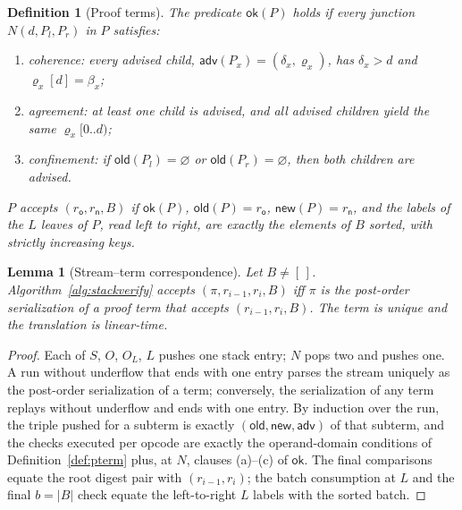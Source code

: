 \documentclass[twocolumn]{article}
\newtheorem{definition}{Definition}
\newtheorem{lemma}{Lemma}
\begin{document}
\begin{definition}[Proof terms]
The predicate $\mathsf{ok}(P)$ holds if every junction $N(d, P_l, P_r)$ in $P$ satisfies:
\begin{enumerate}[nosep,label=(\alph*)]
  \item \emph{coherence}: every advised child, $\mathsf{adv}(P_x) = (\delta_x, \varrho_x)$, has $\delta_x > d$ and $\varrho_x[d] = \beta_x$;
  \item \emph{agreement}: at least one child is advised, and all advised children yield the same $\varrho_x[0..d)$;
  \item \emph{confinement}: if $\mathsf{old}(P_l) = \varnothing$ or $\mathsf{old}(P_r) = \varnothing$, then both children are advised.
\end{enumerate}
$P$ \emph{accepts} $(r_{\mathsf o}, r_{\mathsf n}, B)$ if $\mathsf{ok}(P)$, $\mathsf{old}(P) = r_{\mathsf o}$, $\mathsf{new}(P) = r_{\mathsf n}$, and the labels of the $L$ leaves of $P$, read left to right, are exactly the elements of $B$ sorted, with strictly increasing keys.
\end{definition}

\begin{lemma}[Stream--term correspondence]
\label{lem:parse}
Let $B \neq [\,]$. Algorithm~\ref{alg:stackverify} accepts $(\pi, r_{i-1}, r_i, B)$ iff $\pi$ is the post-order serialization of a proof term that accepts $(r_{i-1}, r_i, B)$. The term is unique and the translation is linear-time.
\end{lemma}
\begin{proof}
Each of $S$, $O$, $O_L$, $L$ pushes one stack entry; $N$ pops two and pushes one. A run without underflow that ends with one entry parses the stream uniquely as the post-order serialization of a term; conversely, the serialization of any term replays without underflow and ends with one entry. By induction over the run, the triple pushed for a subterm is exactly $(\mathsf{old}, \mathsf{new}, \mathsf{adv})$ of that subterm, and the checks executed per opcode are exactly the operand-domain conditions of Definition~\ref{def:pterm} plus, at $N$, clauses (a)--(c) of $\mathsf{ok}$. The final comparisons equate the root digest pair with $(r_{i-1}, r_i)$; the batch consumption at $L$ and the final $b = |B|$ check equate the left-to-right $L$ labels with the sorted batch.
\end{proof}
\end{document}
